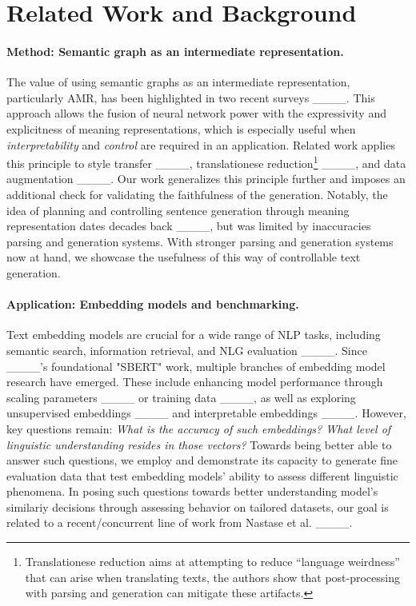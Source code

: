 \section{Related Work and Background}
\label{sec:rw}

\paragraph{Method: Semantic graph as an intermediate representation.} The value of using semantic graphs as an intermediate representation, particularly AMR, has been highlighted in two recent surveys ____. This approach allows the fusion of neural network power with the expressivity and explicitness of meaning representations, which is especially useful when \textit{interpretability} and \textit{control} are required in an application. Related work applies this principle to style transfer ____, translationese reduction\footnote{Translationese reduction aims at attempting to reduce ``language weirdness'' that can arise when translating texts, the authors show that post-processing with parsing and generation can mitigate these artifacts.} ____, and data augmentation ____. Our work generalizes this principle further and imposes an additional check for validating the faithfulness of the generation. Notably, the idea of planning and controlling sentence generation through meaning representation dates decades back ____, but was limited by inaccuracies parsing and generation systems. With stronger parsing and generation systems now at hand, we showcase the usefulness of this way of controllable text generation.

\paragraph{Application: Embedding models and benchmarking.} Text embedding models are crucial for a wide range of NLP tasks, including semantic search, information retrieval, and NLG evaluation ____. Since ____'s foundational "SBERT" work, multiple branches of embedding model research have emerged. These include enhancing model performance through scaling parameters ____ or training data ____, as well as exploring unsupervised embeddings ____ and interpretable embeddings ____. However, key questions remain: \textit{What is the accuracy of such embeddings? What level of linguistic understanding resides in those vectors?} Towards being better able to answer such questions, we employ \model and demonstrate its capacity to generate fine evaluation data that test embedding models' ability to assess different linguistic phenomena. In posing such questions towards better understanding model's similariy decisions through assessing behavior on tailored datasets, our goal is related to a recent/concurrent line of work from Nastase et al. ____.

